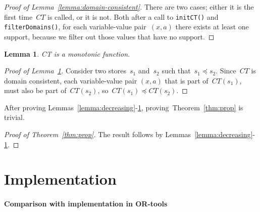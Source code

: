 \documentclass[a4paper,11pt]{article}
\newtheorem{lemma}[theorem]{Lemma}
\newcommand{\T}[1]{\texttt{#1}}
\newcommand{\Thmref}[1]{Theorem~\ref{#1}}
\newcommand{\Lemmaref}[1]{Lemma~\ref{#1}}
\numberwithin{equation}{section}
\begin{document}
\begin{proof}[Proof of \Lemmaref{lemma:domain-consistent}]
  There are two cases; either it is the first time~$CT$ is called, or it
  is not. Both after a call to \T{initCT()} and \T{filterDomains()}, 
  for each variable-value
  pair~$(x,a)$ there exists at least one support, because we filter out those
  values that have no support.
\end{proof}

\begin{lemma}\label{lemma:monotonic}
  CT is a monotonic function.
\end{lemma}

\begin{proof}[Proof of \Lemmaref{lemma:monotonic}]
  Consider two stores~$s_1$ and~$s_2$ such that~$s_1 \preceq s_2$.
  Since~$CT$ is domain consistent, each variable-value pair $(x,a)$
  that is part of~$CT(s_1)$, must also be part of~$CT(s_2)$,
  so~$CT(s_1) \preceq CT(s_2)$.
\end{proof}


After proving Lemmas~\ref{lemma:decreasing}-\ref{lemma:monotonic},
proving~\Thmref{thm:prop} is trivial.

\begin{proof}[Proof of \Thmref{thm:prop}]
  The result follows by Lemmas~\ref{lemma:decreasing}-
  \ref{lemma:monotonic}.
\end{proof}

\section{Implementation}
\label{sec:implementation}

\paragraph{Comparison with implementation in OR-tools}

\end{document}
